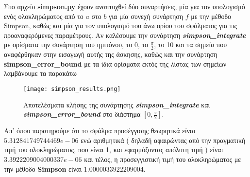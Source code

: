 \documentclass[Second Project.tex]{subfiles}
\begin{document}
Στο αρχείο \textlatin{\textbf{simpson.py}} έχουν αναπτυχθεί δύο συναρτήσεις, μία για τον υπολογισμό ενός ολοκληρώματος
από το $a$ στο $b$ για μία συνεχή συνάρτηση $f$ με την μέθοδο \textlatin{Simpson}, καθώς και μία για τον υπολογισμό του
άνω ορίου του σφάλματος για τις προαναφερόμενες παραμέτρους. Αν καλέσουμε την συνάρτηση 
\textit{\textlatin{\textbf{simpson\_integrate}}} με ορίσματα την συνάρτηση του ημιτόνου, το 0, το $\frac{\pi}{2}$, το 10 
και τα σημεία που αναφέρθηκαν στην εισαγωγή αυτής της άσκησης, καθώς και την συνάρτηση 
\textlatin{\textbf{\textbf{simpson\_error\_bound}}} με τα ίδια ορίσματα εκτός της λίστας των σημείων λαμβάνουμε τα παρακάτω
\begin{figure}[h!]
    \centering
    \captionsetup{justification=centering}
    \begin{center}
    \texttt{[image: simpson\_results.png]}    
    \caption{ Αποτελέσματα κλήσης της συνάρτησης \textit{\textlatin{\textbf{simpson\_integrate}}} 
    και \textit{\textlatin{\textbf{simpson\_error\_bound}}} στο διάστημα $[0, \frac{\pi}{2}]$.}
    \end{center}
\end{figure}

Απ' όπου παρατηρούμε ότι το σφάλμα προσέγγισης θεωρητικά είναι \\ $5.312841749744469e-06$ ενώ αριθμητικά ( δηλαδή 
αφαιρώντας από την πραγματική τιμή του ολοκληρώματος, που είναι 1, και εφαρμόζοντας απόλυτη τιμή ) είναι
$3.3922209004000337e-06$ και τέλος, η προσεγγιστική τιμή του ολοκληρώματος με την μέθοδο \textlatin{\textbf{Simpson}}
είναι $1.0000033922209004$. 
\end{document}
